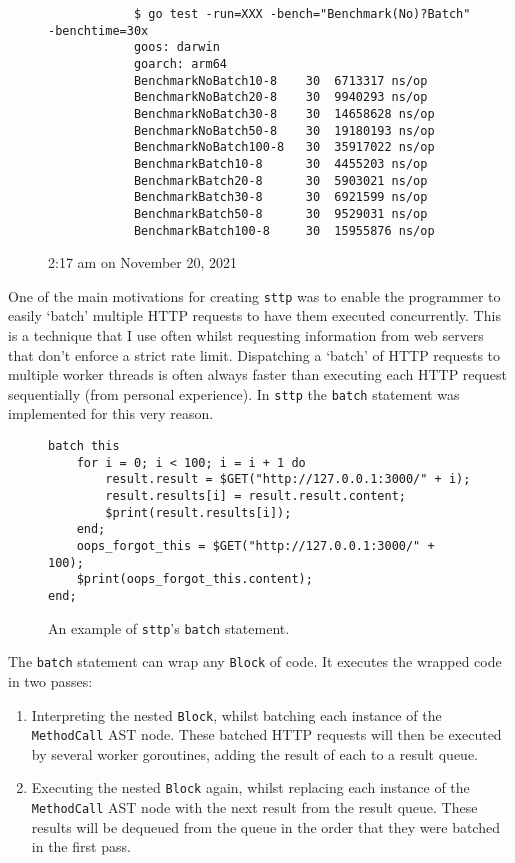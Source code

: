\begin{figure}[H]
\begin{center}
        \begin{verbatim}    
            $ go test -run=XXX -bench="Benchmark(No)?Batch" -benchtime=30x
            goos: darwin
            goarch: arm64
            BenchmarkNoBatch10-8    30  6713317 ns/op
            BenchmarkNoBatch20-8    30  9940293 ns/op
            BenchmarkNoBatch30-8    30  14658628 ns/op
            BenchmarkNoBatch50-8    30  19180193 ns/op 
            BenchmarkNoBatch100-8   30  35917022 ns/op
            BenchmarkBatch10-8      30  4455203 ns/op
            BenchmarkBatch20-8      30  5903021 ns/op
            BenchmarkBatch30-8      30  6921599 ns/op
            BenchmarkBatch50-8      30  9529031 ns/op
            BenchmarkBatch100-8     30  15955876 ns/op
        \end{verbatim}
        \tiny{2:17 am on November 20, 2021}
    \end{center}
\end{figure}

One of the main motivations for creating \verb|sttp| was to enable the programmer to easily `batch' multiple HTTP requests to have them executed concurrently. This is a technique that I use often whilst requesting information from web servers that don't enforce a strict rate limit. Dispatching a `batch' of HTTP requests to multiple worker threads is often always faster than executing each HTTP request sequentially (from personal experience). In \verb|sttp| the \verb|batch| statement was implemented for this very reason.

\begin{figure}[H]
    \begin{verbatim}
batch this
    for i = 0; i < 100; i = i + 1 do
        result.result = $GET("http://127.0.0.1:3000/" + i);
        result.results[i] = result.result.content;
        $print(result.results[i]);
    end;
    oops_forgot_this = $GET("http://127.0.0.1:3000/" + 100);
    $print(oops_forgot_this.content);
end;
    \end{verbatim}
    \cprotect\caption{An example of \verb|sttp|'s \verb|batch| statement.}
\end{figure}

The \verb|batch| statement can wrap any \verb|Block| of code. It executes the wrapped code in two passes:

\begin{enumerate}
    \item Interpreting the nested \verb|Block|, whilst batching each instance of the \verb|MethodCall| AST node. These batched HTTP requests will then be executed by several worker goroutines, adding the result of each to a result queue.
    \item Executing the nested \verb|Block| again, whilst replacing each instance of the \verb|MethodCall| AST node with the next result from the result queue. These results will be dequeued from the queue in the order that they were batched in the first pass.
\end{enumerate}

